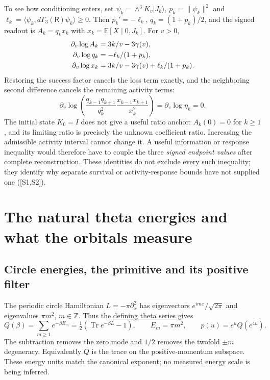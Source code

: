 \documentclass[11pt,letterpaper]{article}
\numberwithin{equation}{section}
\theoremstyle{remark}
\DeclareMathOperator{\Tr}{Tr}
\newcommand{\E}{\mathbb E}
\newcommand{\ket}[1]{\lvert #1\rangle}
\newcommand{\ip}[2]{\langle #1,#2\rangle}
\newcommand{\loss}{\mathsf R}
\newcommand{\ev}[1]{\textsf{[#1]}}
\begin{document}
To see how conditioning enters, set
$\psi_k=\wedge^3K_v\ket{J_k}$, $p_k=\|\psi_k\|^2$ and
$\ell_k=\ip{\psi_k}{d\Gamma_3(\loss)\psi_k}\ge0$. Then
$p_k'=-\ell_k$, $q_k=(1+p_k)/2$, and the signed readout is
$A_k=q_kx_k$ with $x_k=\E[X\mid0,J_k]$. For $v>0$,
\begin{align}
 \partial_v\log A_k&=3k/v-3\gamma(v),\notag\\
 \partial_v\log q_k&=-\ell_k/(1+p_k),\notag\\
 \partial_v\log x_k&=3k/v-3\gamma(v)+\ell_k/(1+p_k).
 \label{eq:responsecancel}
\end{align}
Restoring the success factor cancels the loss term exactly, and the
neighboring second difference cancels the remaining activity terms:
\begin{equation}
 \partial_v\log\left(
 \frac{q_{k-1}q_{k+1}}{q_k^2}\frac{x_{k-1}x_{k+1}}{x_k^2}
 \right)=\partial_v\log\eta_k=0. \label{eq:ratioresponse}
\end{equation}
The initial state $K_0=I$ does not give a useful ratio anchor:
$A_k(0)=0$ for $k\ge1$, and its limiting ratio is precisely the unknown
coefficient ratio. Increasing the admissible activity interval cannot
change it. A useful information or response inequality would therefore
have to couple the three \emph{signed endpoint values} after complete
reconstruction. These identities do not exclude every such inequality;
they identify why separate survival or activity-response bounds have
not supplied one (\ev{S1,S2}).

\section{The natural theta energies and what the orbitals measure}
\label{sec:energy}

\subsection{Circle energies, the primitive and its positive filter}
The periodic circle Hamiltonian $L=-\pi\partial_x^2$ has eigenvectors
$e^{imx}/\sqrt{2\pi}$ and eigenvalues $\pi m^2$, $m\in\mathbb Z$.
Thus the \href{https://dlmf.nist.gov/20.2.E3}{defining theta series} \cite[20.2.3]{NISTDLMFPositiveThetaPrimitives}
gives
\begin{equation}
 Q(\beta)=\sum_{m\ge1}e^{-\beta E_m}
 =\tfrac12(\Tr e^{-\beta L}-1),\qquad E_m=\pi m^2,
 \qquad p(u)=e^uQ(e^{4u}). \label{eq:energies}
\end{equation}
The subtraction removes the zero mode and $1/2$ removes the twofold
$\pm m$ degeneracy. Equivalently $Q$ is the trace on the positive-momentum
subspace. These energy units match the canonical exponent; no measured
energy scale is being inferred.
\end{document}
